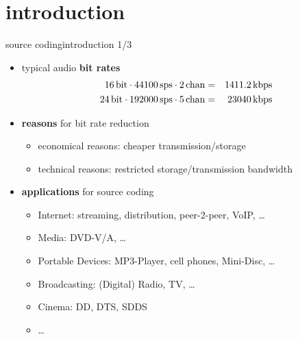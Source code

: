 



\subtitle{Part 23: Source Coding}


	

\section[intro]{introduction}

	\begin{frame}{source coding}{introduction 1/3}
		\begin{itemize}
			\item	typical audio \textbf{bit rates}
				\begin{eqnarray}
					\unit[16]{bit}\cdot\unit[44100]{sps}\cdot\unit[2]{chan} &=& \unit[1411.2]{kbps}\nonumber\\
					\unit[24]{bit}\cdot\unit[192000]{sps}\cdot\unit[5]{chan} &=& \unit[23040]{kbps}\nonumber
				\end{eqnarray}
			\vspace{-5mm}
			\item<2->	\textbf{reasons} for bit rate reduction
				\begin{itemize}
					\item	economical reasons: cheaper transmission/storage
					\item	technical reasons: restricted storage/transmission bandwidth
				\end{itemize}
			\smallskip
			\item<3->	\textbf{applications} for source coding
				\begin{itemize}
					\item	Internet: streaming, distribution, peer-2-peer, VoIP, \ldots
					\item	Media: DVD-V/A, \ldots
					\item	Portable Devices: MP3-Player, cell phones, Mini-Disc, \ldots
					\item	Broadcasting: (Digital) Radio, TV, \ldots
					\item	Cinema: DD, DTS, SDDS
					\item	\ldots
				\end{itemize}
		\end{itemize}
	\end{frame}
